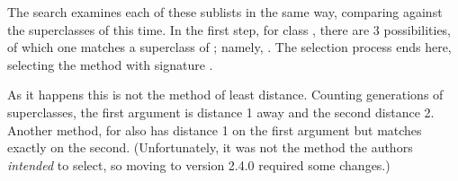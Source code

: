 \documentclass[11pt]{article}
\begin{document}
The search examines each of these sublists in the same way, comparing against the superclasses of  this time.
In the first step, for class , there are 3 possibilities, of which one matches a superclass of ; namely, .
The selection process ends here, selecting the method with signature .

As it happens this is not the method of least distance.
Counting generations of superclasses, the first argument is distance 1 away and the second distance 2.
Another method, for  also has distance 1 on the first argument but matches exactly on the second.
(Unfortunately, it was not the method the authors \emph{intended}  to select, so moving to version 2.4.0 required some changes.)
\end{document}
